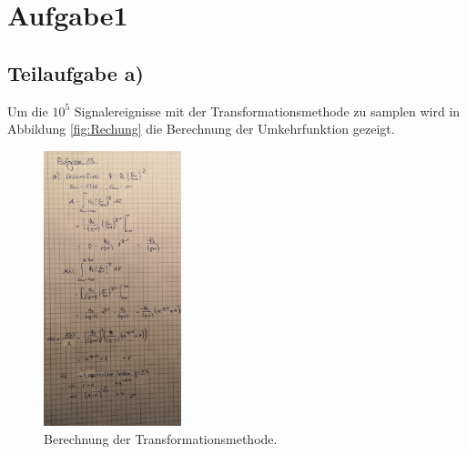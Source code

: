 \section{Aufgabe1}
\label{sec:Aufgabe1}
%
\subsection{Teilaufgabe a)}
Um die $10^5$ Signalereignisse mit der Transformationsmethode zu samplen wird
in Abbildung \ref{fig:Rechung} die Berechnung der Umkehrfunktion gezeigt.
\begin{figure}[h]
  \centering
  \includegraphics[height = 8cm]{pics/Blatt5_1a.jpeg}
  \caption{Berechnung der Transformationsmethode.}
  \label{fig:Rechnung}
\end{figure}
